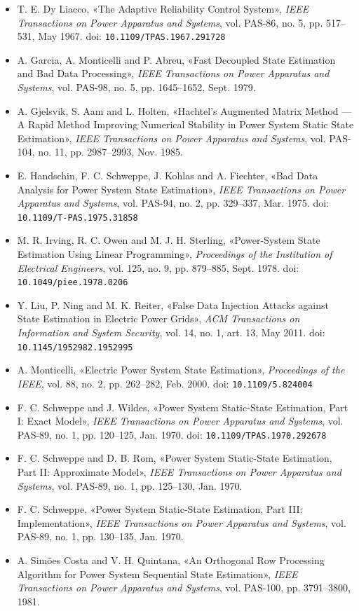 \begin{itemize}
\item T. E. Dy Liacco, «The Adaptive Reliability Control System», \textit{IEEE Transactions
      on Power Apparatus and Systems}, vol. PAS-86, no. 5, pp. 517--531, May 1967.
      doi: \texttt{10.1109/TPAS.1967.291728}
\item A. Garcia, A. Monticelli and P. Abreu, «Fast Decoupled State Estimation and Bad Data
      Processing», \textit{IEEE Transactions on Power Apparatus and Systems}, vol. PAS-98,
      no. 5, pp. 1645--1652, Sept. 1979.
\item A. Gjelsvik, S. Aam and L. Holten, «Hachtel's Augmented Matrix Method --- A Rapid Method
      Improving Numerical Stability in Power System Static State Estimation», \textit{IEEE
      Transactions on Power Apparatus and Systems}, vol. PAS-104, no. 11, pp. 2987--2993,
      Nov. 1985.
\item E. Handschin, F. C. Schweppe, J. Kohlas and A. Fiechter, «Bad Data Analysis for Power
      System State Estimation», \textit{IEEE Transactions on Power Apparatus and Systems},
      vol. PAS-94, no. 2, pp. 329--337, Mar. 1975. doi: \texttt{10.1109/T-PAS.1975.31858}
\item M. R. Irving, R. C. Owen and M. J. H. Sterling, «Power-System State Estimation Using
      Linear Programming», \textit{Proceedings of the Institution of Electrical Engineers},
      vol. 125, no. 9, pp. 879--885, Sept. 1978. doi: \texttt{10.1049/piee.1978.0206}
\item Y. Liu, P. Ning and M. K. Reiter, «False Data Injection Attacks against State
      Estimation in Electric Power Grids», \textit{ACM Transactions on Information and System
      Security}, vol. 14, no. 1, art. 13, May 2011.
      doi: \texttt{10.1145/1952982.1952995}
\item A. Monticelli, «Electric Power System State Estimation», \textit{Proceedings of the
      IEEE}, vol. 88, no. 2, pp. 262--282, Feb. 2000.
      doi: \texttt{10.1109/5.824004}
\item F. C. Schweppe and J. Wildes, «Power System Static-State Estimation, Part I: Exact
      Model», \textit{IEEE Transactions on Power Apparatus and Systems}, vol. PAS-89, no. 1,
      pp. 120--125, Jan. 1970. doi: \texttt{10.1109/TPAS.1970.292678}
\item F. C. Schweppe and D. B. Rom, «Power System Static-State Estimation, Part II:
      Approximate Model», \textit{IEEE Transactions on Power Apparatus and Systems},
      vol. PAS-89, no. 1, pp. 125--130, Jan. 1970.
\item F. C. Schweppe, «Power System Static-State Estimation, Part III: Implementation»,
      \textit{IEEE Transactions on Power Apparatus and Systems}, vol. PAS-89, no. 1,
      pp. 130--135, Jan. 1970.
\item A. Simões Costa and V. H. Quintana, «An Orthogonal Row Processing Algorithm for Power
      System Sequential State Estimation», \textit{IEEE Transactions on Power Apparatus and
      Systems}, vol. PAS-100, pp. 3791--3800, 1981.
\end{itemize}

